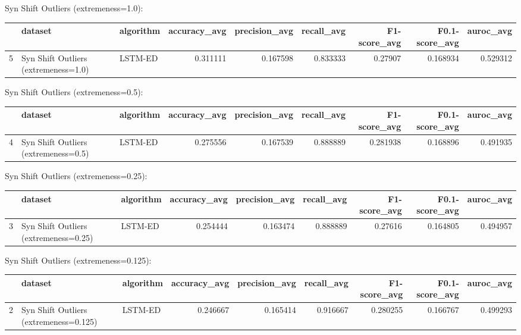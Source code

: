 Syn Shift Outliers (extremeness=1.0):

\begin{tabular}{rllrrrrrr}
\hline
    & dataset                              & algorithm   &   accuracy\_avg &   precision\_avg &   recall\_avg &   F1-score\_avg &   F0.1-score\_avg &   auroc\_avg \\
\hline
  5 & Syn Shift Outliers (extremeness=1.0) & LSTM-ED     &       0.311111 &        0.167598 &     0.833333 &        0.27907 &         0.168934 &    0.529312 \\
\hline
\end{tabular}

Syn Shift Outliers (extremeness=0.5):

\begin{tabular}{rllrrrrrr}
\hline
    & dataset                              & algorithm   &   accuracy\_avg &   precision\_avg &   recall\_avg &   F1-score\_avg &   F0.1-score\_avg &   auroc\_avg \\
\hline
  4 & Syn Shift Outliers (extremeness=0.5) & LSTM-ED     &       0.275556 &        0.167539 &     0.888889 &       0.281938 &         0.168896 &    0.491935 \\
\hline
\end{tabular}

Syn Shift Outliers (extremeness=0.25):

\begin{tabular}{rllrrrrrr}
\hline
    & dataset                               & algorithm   &   accuracy\_avg &   precision\_avg &   recall\_avg &   F1-score\_avg &   F0.1-score\_avg &   auroc\_avg \\
\hline
  3 & Syn Shift Outliers (extremeness=0.25) & LSTM-ED     &       0.254444 &        0.163474 &     0.888889 &        0.27616 &         0.164805 &    0.494957 \\
\hline
\end{tabular}

Syn Shift Outliers (extremeness=0.125):

\begin{tabular}{rllrrrrrr}
\hline
    & dataset                                & algorithm   &   accuracy\_avg &   precision\_avg &   recall\_avg &   F1-score\_avg &   F0.1-score\_avg &   auroc\_avg \\
\hline
  2 & Syn Shift Outliers (extremeness=0.125) & LSTM-ED     &       0.246667 &        0.165414 &     0.916667 &       0.280255 &         0.166767 &    0.499293 \\
\hline
\end{tabular}

